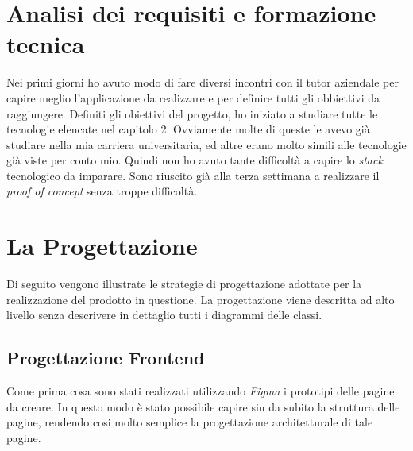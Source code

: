 \section{Analisi dei requisiti e formazione tecnica}
Nei primi giorni ho avuto modo di fare diversi incontri con il tutor aziendale per capire meglio l'applicazione da realizzare e per definire tutti gli obbiettivi da raggiungere. 
Definiti gli obiettivi del progetto, ho iniziato a studiare tutte le tecnologie elencate nel capitolo 2. Ovviamente molte di queste le avevo già studiare nella mia carriera universitaria, ed altre erano molto simili alle tecnologie già viste per conto mio. Quindi non ho avuto tante difficoltà a capire lo \emph{stack} tecnologico da imparare.
 Sono riuscito già alla terza settimana a realizzare il \emph{proof of concept} senza troppe difficoltà.
 \newpage  
\section{La Progettazione}

Di seguito vengono illustrate le strategie di progettazione adottate per la realizzazione del prodotto in questione. La progettazione viene descritta ad alto livello senza descrivere in dettaglio tutti i diagrammi delle classi.
\subsection{Progettazione Frontend}
\label{sec:progettazione}
Come prima cosa sono stati realizzati utilizzando \emph{Figma} i prototipi delle pagine da creare. In questo modo è stato possibile capire sin da subito la struttura delle pagine, rendendo cosi molto semplice la progettazione architetturale di tale pagine.
